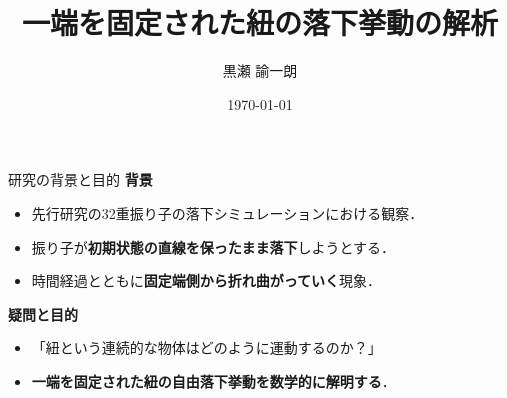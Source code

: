 \documentclass[11pt, unicode, aspectratio=169]{beamer}
\title{一端を固定された紐の落下挙動の解析}
\author{黒瀬 諭一朗}
\institute{埼玉県立大宮高等学校 物理部}
\date{\today}
\begin{document}
\begin{frame}
  \titlepage
\end{frame}

\begin{frame}{研究の背景と目的}
  \textbf{背景}
  \begin{itemize}
    \item 先行研究の32重振り子の落下シミュレーションにおける観察．
    \item 振り子が\textbf{初期状態の直線を保ったまま落下}しようとする．
    \item 時間経過とともに\textbf{固定端側から折れ曲がっていく}現象．
  \end{itemize}
  \vspace{1em}
  
  \textbf{疑問と目的}
  \begin{itemize}
    \item 「紐という連続的な物体はどのように運動するのか？」
    \item \textbf{一端を固定された紐の自由落下挙動を数学的に解明する}．
  \end{itemize}
\end{frame}
\end{document}
